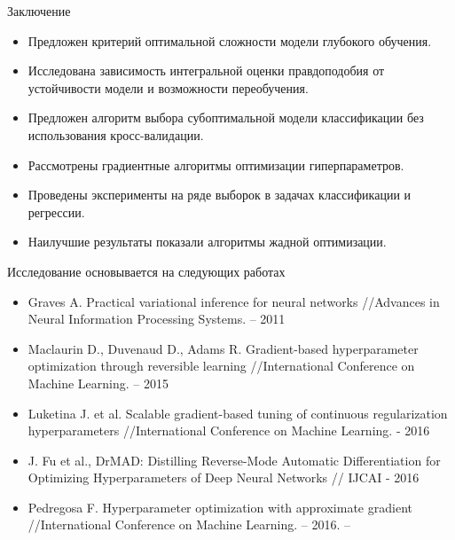 \documentclass[11pt,pdf,utf8,russian,aspectratio=169]{beamer}
\begin{document}
\begin{frame}{Заключение}
\begin{itemize}
\item Предложен критерий оптимальной сложности модели глубокого обучения.
\item Исследована зависимость интегральной оценки правдоподобия от устойчивости модели и возможности переобучения.
\item Предложен алгоритм выбора субоптимальной модели классификации без использования кросс-валидации.
\item Рассмотрены градиентные алгоритмы оптимизации гиперпараметров.
\item Проведены эксперименты на ряде выборок в задачах классификации и регрессии.
\item Наилучшие результаты показали алгоритмы жадной оптимизации.
\end{itemize}
\end{frame}

\appendix
\bgroup
{}
\begin{frame}
\end{frame}
\egroup



\begin{frame}{Исследование основывается на следующих работах}
\begin{itemize}
\item Graves A. Practical variational inference for neural networks //Advances in Neural Information Processing Systems. – 2011
\item  Maclaurin D., Duvenaud D., Adams R. Gradient-based hyperparameter optimization through reversible learning //International Conference on Machine Learning. – 2015
\item  Luketina J. et al. Scalable gradient-based tuning of continuous regularization hyperparameters //International Conference on Machine Learning. - 2016
\item J. Fu et al., DrMAD: Distilling Reverse-Mode Automatic Differentiation for Optimizing
Hyperparameters of Deep Neural Networks // IJCAI - 2016
\item Pedregosa F. Hyperparameter optimization with approximate gradient //International Conference on Machine Learning. – 2016. –
\end{itemize}
\end{frame}
\end{document}

